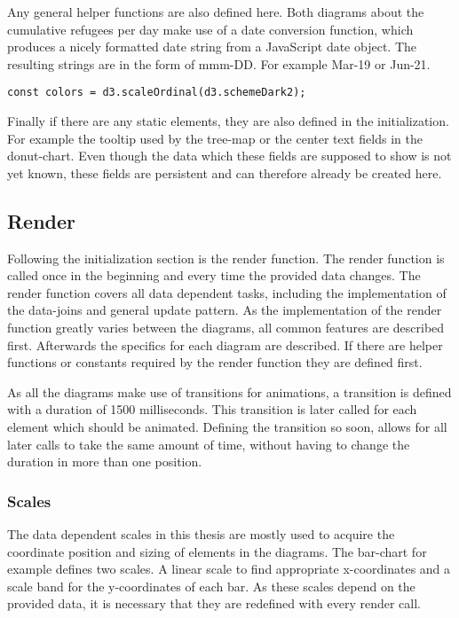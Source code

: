 Any general helper functions are also defined here. Both diagrams about the cumulative refugees per day make use of a date conversion function, which produces a nicely formatted date string from a JavaScript date object. The resulting strings are in the form of mmm-DD. For example Mar-19 or Jun-21.

\begin{minipage}{0.9\linewidth}
    \begin{lstlisting}[style=htmlcssjs, captionpos=b, caption={Definition of the data independent color scale. \texttt{d3.schemeDarkv2} is a predefined list of color values which is to be used by the scale.}, label={color_scale}]
const colors = d3.scaleOrdinal(d3.schemeDark2);
    \end{lstlisting}
\end{minipage}

Finally if there are any static elements, they are also defined in the initialization. For example the tooltip used by the tree-map or the center text fields in the donut-chart. Even though the data which these fields are supposed to show is not yet known, these fields are persistent and can therefore already be created here.

\subsection{Render}
Following the initialization section is the render function. The render function is called once in the beginning and every time the provided data changes. The render function covers all data dependent tasks, including the implementation of the data-joins and general update pattern. As the implementation of the render function greatly varies between the diagrams, all common features are described first. Afterwards the specifics for each diagram are described. If there are helper functions or constants required by the render function they are defined first. 

As all the diagrams make use of transitions for animations, a transition is defined with a duration of 1500 milliseconds. This transition is later called for each element which should be animated. Defining the transition so soon, allows for all later calls to take the same amount of time, without having to change the duration in more than one position.

\subsubsection{Scales}
The data dependent scales in this thesis are mostly used to acquire the coordinate position and sizing of elements in the diagrams.  The bar-chart for example defines two scales. A linear scale to find appropriate x-coordinates and a scale band for the y-coordinates of each bar. As these scales depend on the provided data, it is necessary that they are redefined with every render call.

